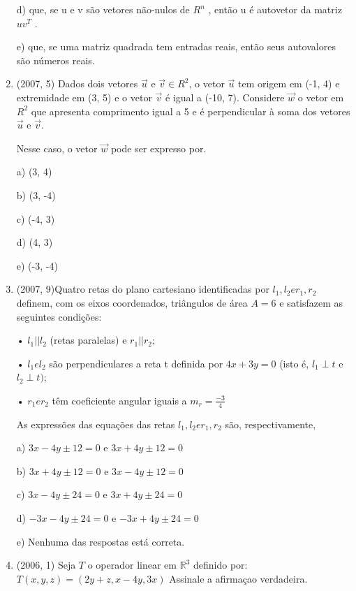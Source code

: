 \documentclass{article}
\begin{document}
\begin{enumerate}
d) que, se u e v são vetores não-nulos de $R^n$ , então u é autovetor da matriz $uv^T$  .

e) que, se uma matriz quadrada tem entradas reais, então seus autovalores são números reais.\newline


\item(2007, 5) Dados dois vetores $\vec u$ e $\vec v \in R^2$, o vetor $\vec u$ tem origem em (-1, 4) e extremidade em (3, 5) e o vetor $\vec v$ é igual a (-10, 7). Considere $\vec w$ o vetor em $R^2$ que apresenta comprimento igual a 5 e é perpendicular à soma dos vetores $\vec u$ e $\vec v$.

Nesse caso, o vetor $\vec w$ pode ser expresso por. 

a) (3, 4)

b) (3, -4)

c) (-4, 3)

d) (4, 3)

e) (-3, -4)\newline





\item(2007, 9)Quatro retas do plano cartesiano identificadas por $l_1 , l_2 e r_1 , r_2$ definem, com os eixos coordenados, triângulos de área $A = 6$ e satisfazem as seguintes condições:

• $l_1 || l_2$ (retas paralelas) e $r_1 || r_2 ;$

• $l_1 e l_2$ são perpendiculares a reta t definida por $4x + 3y = 0$ (isto é, $l_1  \perp t$ e $l_2  \perp t);$

• $r_1 e r_2$ têm coeficiente angular iguais a $m_r =\frac{-3}{4}$

As expressões das equações das retas $l_1 , l_2 e r_1 , r_2$ são, respectivamente,

a) $3x-4y \pm 12 =0$ e $3x + 4y \pm 12 =0$

b) $3x+4y \pm 12 =0$ e $3x - 4y \pm 12 =0$

c) $3x-4y \pm 24 =0$ e $3x + 4y \pm 24 =0$

d) $-3x-4y \pm 24 =0$ e $-3x + 4y \pm 24 =0$

e) Nenhuma das respostas está correta. \newline






\item(2006, 1) Seja $T$ o operador linear em $\mathbb{R}^{3}$ definido por: $T(x, y, z)=(2 y+z, x-4 y, 3 x)$ Assinale a afirmaçao verdadeira.


\end{enumerate}
\end{document}

